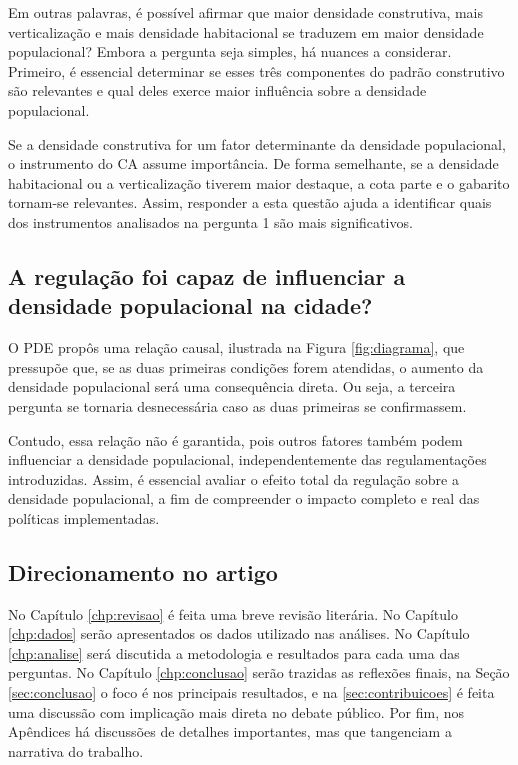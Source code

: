 Em outras palavras, é possível afirmar que maior densidade construtiva, mais verticalização e mais densidade habitacional se traduzem em maior densidade populacional? Embora a pergunta seja simples, há nuances a considerar. Primeiro, é essencial determinar se esses três componentes do padrão construtivo são relevantes e qual deles exerce maior influência sobre a densidade populacional.

Se a densidade construtiva for um fator determinante da densidade populacional, o instrumento do CA assume importância. De forma semelhante, se a densidade habitacional ou a verticalização tiverem maior destaque, a cota parte e o gabarito tornam-se relevantes. Assim, responder a esta questão ajuda a identificar quais dos instrumentos analisados na pergunta 1 são mais significativos.

\subsection*{A regulação foi capaz de influenciar a densidade populacional na cidade?} 

O PDE propôs uma relação causal, ilustrada na Figura \ref{fig:diagrama}, que pressupõe que, se as duas primeiras condições forem atendidas, o aumento da densidade populacional será uma consequência direta. Ou seja, a terceira pergunta se tornaria desnecessária caso as duas primeiras se confirmassem.

Contudo, essa relação não é garantida, pois outros fatores também podem influenciar a densidade populacional, independentemente das regulamentações introduzidas. Assim, é essencial avaliar o efeito total da regulação sobre a densidade populacional, a fim de compreender o impacto completo e real das políticas implementadas.

\subsection*{Direcionamento no artigo}

No Capítulo \ref{chp:revisao} é feita uma breve revisão literária. No Capítulo \ref{chp:dados} serão apresentados os dados utilizado nas análises. No Capítulo \ref{chp:analise} será discutida a metodologia e resultados para cada uma das perguntas. No Capítulo \ref{chp:conclusao} serão trazidas as reflexões finais, na Seção \ref{sec:conclusao} o foco é nos principais resultados, e na \ref{sec:contribuicoes} é feita uma discussão com implicação mais direta no debate público. Por fim, nos Apêndices há discussões de detalhes importantes, mas que tangenciam a narrativa do trabalho.


